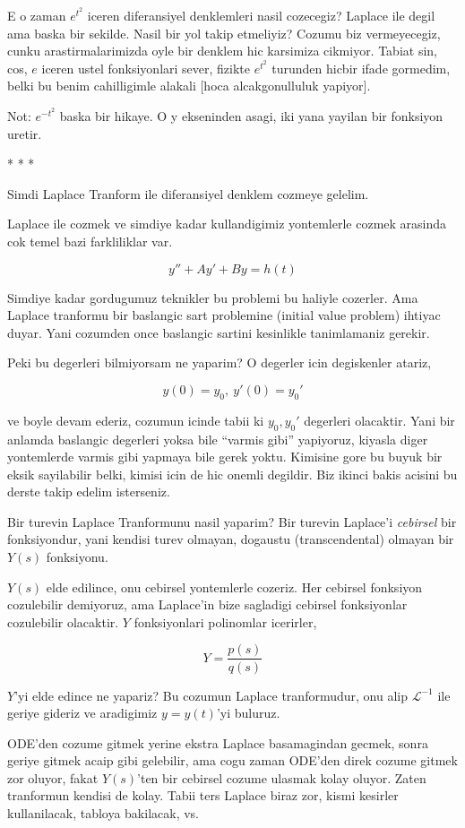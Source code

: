 \documentclass[12pt,fleqn]{article}\usepackage{../common}
\begin{document}
E o zaman $e^{t^2}$ iceren diferansiyel denklemleri nasil cozecegiz?
Laplace ile degil ama baska bir sekilde. Nasil bir yol takip etmeliyiz?
Cozumu biz vermeyecegiz, cunku arastirmalarimizda oyle bir denklem hic
karsimiza cikmiyor. Tabiat sin, cos, $e$ iceren ustel fonksiyonlari
sever, fizikte $e^{t^2}$ turunden hicbir ifade gormedim, belki bu benim
cahilligimle alakali [hoca alcakgonulluluk yapiyor]. 

Not: $e^{-t^2}$ baska bir hikaye. O y ekseninden asagi, iki yana yayilan bir
fonksiyon uretir. 

* * * 

Simdi Laplace Tranform ile diferansiyel denklem cozmeye gelelim. 

Laplace ile cozmek ve simdiye kadar kullandigimiz yontemlerle cozmek
arasinda cok temel bazi farkliliklar var. 

\[ y'' + Ay' + By = h(t) \]

Simdiye kadar gordugumuz teknikler bu problemi bu haliyle cozerler. Ama
Laplace tranformu bir baslangic sart problemine (initial value problem)
ihtiyac duyar. Yani cozumden once baslangic sartini kesinlikle tanimlamaniz
gerekir. 

Peki bu degerleri bilmiyorsam ne yaparim? O degerler icin degiskenler
atariz, 

\[ y(0) = y_0, \ y'(0) = y_0' \]

ve boyle devam ederiz, cozumun icinde tabii ki $y_0,y_0'$ degerleri
olacaktir. Yani bir anlamda baslangic degerleri yoksa bile ``varmis gibi''
yapiyoruz, kiyasla diger yontemlerde varmis gibi yapmaya bile gerek
yoktu. Kimisine gore bu buyuk bir eksik sayilabilir belki, kimisi icin de
hic onemli degildir. Biz ikinci bakis acisini bu derste takip edelim
isterseniz.

Bir turevin Laplace Tranformunu nasil yaparim? Bir turevin Laplace'i
{\em cebirsel} bir fonksiyondur, yani kendisi turev olmayan, dogaustu
(transcendental) olmayan bir $Y(s)$ fonksiyonu. 

$Y(s)$ elde edilince, onu cebirsel yontemlerle cozeriz. Her cebirsel
fonksiyon cozulebilir demiyoruz, ama Laplace'in bize sagladigi cebirsel
fonksiyonlar cozulebilir olacaktir. $Y$ fonksiyonlari polinomlar icerirler, 

\[ Y = \frac{p(s)}{q(s)} \]

$Y$'yi elde edince ne yapariz? Bu cozumun Laplace tranformudur, onu alip
$\mathcal{L}^{-1}$ ile geriye gideriz ve aradigimiz $y = y(t)$'yi buluruz. 

ODE'den cozume gitmek yerine ekstra Laplace basamagindan gecmek, sonra
geriye gitmek acaip gibi gelebilir, ama cogu zaman ODE'den direk cozume
gitmek zor oluyor, fakat $Y(s)$'ten bir cebirsel cozume ulasmak kolay
oluyor. Zaten tranformun kendisi de kolay. Tabii ters Laplace biraz zor,
kismi kesirler kullanilacak, tabloya bakilacak, vs. 
\end{document}
